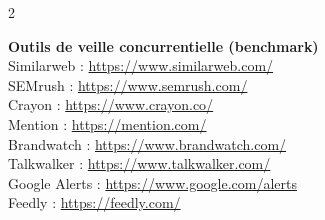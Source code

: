\documentclass[12pt,a4paper,openany]{report}
\begin{document}
\begin{multicols}{2}
\vspace{0.3cm}

\textbf{\color{ensaBlue}Outils de veille concurrentielle (benchmark)}\\
Similarweb : \url{https://www.similarweb.com/}\\
SEMrush : \url{https://www.semrush.com/}\\
Crayon : \url{https://www.crayon.co/}\\
Mention : \url{https://mention.com/}\\
Brandwatch : \url{https://www.brandwatch.com/}\\
Talkwalker : \url{https://www.talkwalker.com/}\\
Google Alerts : \url{https://www.google.com/alerts}\\
Feedly : \url{https://feedly.com/}

\end{multicols}
\end{document}
